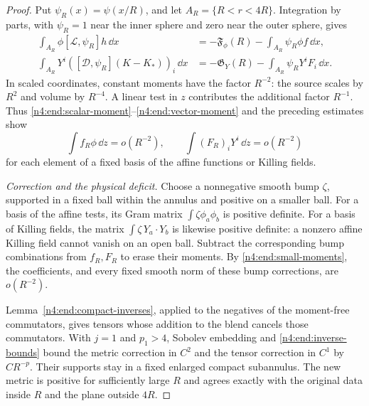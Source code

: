 \begin{proof}
Put \(\psi_R(x)=\psi(x/R)\), and let \(A_R=\{R<r<4R\}\).
Integration by parts, with \(\psi_R=1\) near the inner sphere and zero
near the outer sphere, gives
\begin{align}
 \int_{A_R}\phi[\mathcal L,\psi_R]h\,\dd x
  &=-\mathfrak F_\phi(R)-\int_{A_R}\psi_R\phi f\,\dd x,
       \label{n4:end:scalar-moment}\\
 \int_{A_R}Y^i([\mathcal D,\psi_R](K-K_*))_i\,\dd x
  &=-\mathfrak G_Y(R)-\int_{A_R}\psi_RY^iF_i\,\dd x.
       \label{n4:end:vector-moment}
\end{align}
In scaled coordinates, constant moments have the factor \(R^{-2}\):
the source scales by \(R^2\) and volume by \(R^{-4}\).
A linear test in \(z\) contributes the additional factor \(R^{-1}\).
Thus \eqref{n4:end:scalar-moment}--\eqref{n4:end:vector-moment} and the preceding
estimates show
\begin{equation}\label{n4:end:small-moments}
 \int f_R\phi\,\dd z=o(R^{-2}),\qquad
 \int (F_R)_iY^i\,\dd z=o(R^{-2})
\end{equation}
for each element of a fixed basis of the affine functions or Killing
fields.

\smallskip
\noindent\emph{Correction and the physical deficit.} Choose a nonnegative smooth bump \(\zeta\), supported in a fixed ball
within the annulus and positive on a smaller ball. For a basis of the
affine tests, its Gram matrix
\(\int\zeta\phi_a\phi_b\) is positive definite. For a basis of
Killing fields, the matrix \(\int\zeta\,Y_a\cdot Y_b\) is likewise
positive definite: a nonzero affine Killing field cannot vanish on an
open ball. Subtract the corresponding bump combinations from
\(f_R,F_R\) to erase their moments. By \eqref{n4:end:small-moments},
the coefficients, and every fixed smooth norm of these bump corrections,
are \(o(R^{-2})\).

Lemma~\ref{n4:end:compact-inverses}, applied to the negatives of the
moment-free commutators, gives tensors whose addition to the blend
cancels those commutators.
With \(j=1\) and \(p_1>4\), Sobolev embedding and
\eqref{n4:end:inverse-bounds} bound the metric correction in \(C^2\)
and the tensor correction in \(C^1\) by \(CR^{-p}\).
Their supports stay in a fixed enlarged compact subannulus.
The new metric is positive for sufficiently large \(R\) and agrees
exactly with the original data inside \(R\) and the plane outside
\(4R\).


\end{proof}
